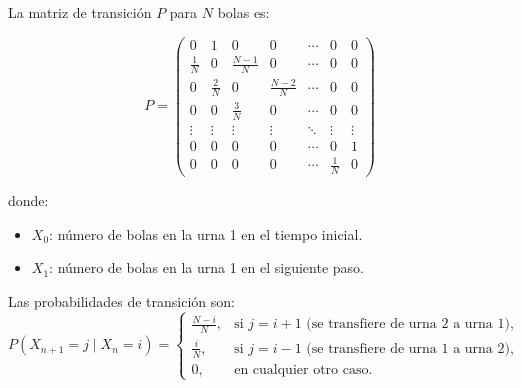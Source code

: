 \documentclass[12pt,a4paper]{article}
\begin{document}
\begin{center}
\end{center}

La matriz de transición $P$ para $N$ bolas es:

\begin{equation*}
P =
\begin{pmatrix}
0 & 1 & 0 & 0 & \cdots & 0 & 0 \\
\frac{1}{N} & 0 & \frac{N-1}{N} & 0 & \cdots & 0 & 0 \\
0 & \frac{2}{N} & 0 & \frac{N-2}{N} & \cdots & 0 & 0 \\
0 & 0 & \frac{3}{N} & 0 & \cdots & 0 & 0 \\
\vdots & \vdots & \vdots & \vdots & \ddots & \vdots & \vdots \\
0 & 0 & 0 & 0 & \cdots & 0 & 1 \\
0 & 0 & 0 & 0 & \cdots & \frac{1}{N} & 0
\end{pmatrix}
\end{equation*}

donde:
\begin{itemize}
    \item $X_0$: número de bolas en la urna 1 en el tiempo inicial.
    \item $X_1$: número de bolas en la urna 1 en el siguiente paso.
\end{itemize}

Las probabilidades de transición son:
\begin{equation*}
P(X_{n+1} = j \mid X_n = i) =
\begin{cases}
\frac{N-i}{N}, & \text{si } j = i+1 \text{ (se transfiere de urna 2 a urna 1)},\\
\frac{i}{N}, & \text{si } j = i-1 \text{ (se transfiere de urna 1 a urna 2)},\\
0, & \text{en cualquier otro caso}.
\end{cases}
\end{equation*}
\end{document}
